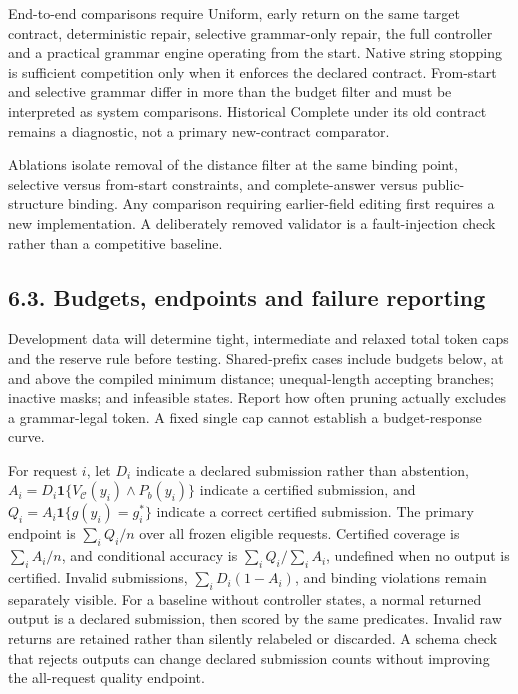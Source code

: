 \documentclass[
  12pt,
  a4paper,
]{article}
\begin{document}
End-to-end comparisons require Uniform, early return on the same target
contract, deterministic repair, selective grammar-only repair, the full
controller and a practical grammar engine operating from the start.
Native string stopping is sufficient competition only when it enforces
the declared contract. From-start and selective grammar differ in more
than the budget filter and must be interpreted as system comparisons.
Historical Complete under its old contract remains a diagnostic, not a
primary new-contract comparator.

Ablations isolate removal of the distance filter at the same binding
point, selective versus from-start constraints, and complete-answer
versus public-structure binding. Any comparison requiring earlier-field
editing first requires a new implementation. A deliberately removed
validator is a fault-injection check rather than a competitive baseline.

\subsection{6.3. Budgets, endpoints and failure
reporting}\label{budgets-endpoints-and-failure-reporting}

Development data will determine tight, intermediate and relaxed total
token caps and the reserve rule before testing. Shared-prefix cases
include budgets below, at and above the compiled minimum distance;
unequal-length accepting branches; inactive masks; and infeasible
states. Report how often pruning actually excludes a grammar-legal
token. A fixed single cap cannot establish a budget-response curve.

For request \(i\), let \(D_i\) indicate a declared submission rather
than abstention,
\(A_i=D_i\mathbf 1\{V_{\mathcal C}(y_i)\land P_b(y_i)\}\) indicate a
certified submission, and \(Q_i=A_i\mathbf 1\{g(y_i)=g_i^*\}\) indicate
a correct certified submission. The primary endpoint is \(\sum_i Q_i/n\)
over all frozen eligible requests. Certified coverage is
\(\sum_i A_i/n\), and conditional accuracy is \(\sum_i Q_i/\sum_i A_i\),
undefined when no output is certified. Invalid submissions,
\(\sum_i D_i(1-A_i)\), and binding violations remain separately visible.
For a baseline without controller states, a normal returned output is a
declared submission, then scored by the same predicates. Invalid raw
returns are retained rather than silently relabeled or discarded. A
schema check that rejects outputs can change declared submission counts
without improving the all-request quality endpoint.
\end{document}
